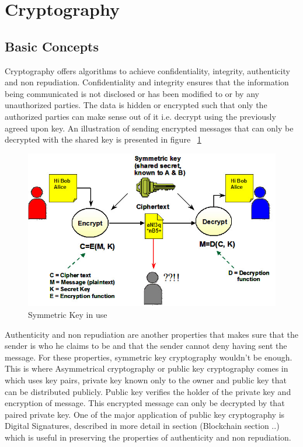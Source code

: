 \section{Cryptography}
\subsection{Basic Concepts}
Cryptography offers algorithms to achieve confidentiality, integrity, authenticity 
and non repudiation. Confidentiality and integrity ensures that the information 
being communicated is not disclosed or has been modified to or by any unauthorized 
parties. The data is hidden or encrypted such that only the authorized parties can 
make sense out of it i.e. decrypt using the previously agreed upon key. 
An illustration of 
sending encrypted messages that can only be decrypted with the shared key is presented 
in figure ~\ref{fig:basic terminology}
\begin{figure}[h]
\centering
\includegraphics[width = 1.0\textwidth]{symmetric-alice-bob.jpg}
\caption{Symmetric Key in use \cite{symmetrickey} }
\label{fig:basic terminology}
\end{figure}
Authenticity and non repudiation are another properties that makes sure that 
the sender is who he claims to be and that the sender cannot deny having sent 
the message. For these properties, symmetric key cryptography wouldn't be 
enough. This is where Asymmetrical cryptography or public key cryptography comes 
in which uses key pairs, private key known only to the owner and public key that 
can be distributed publicly. Public key verifies the holder of the private key 
and encryption of message. This encrypted message can only be decrypted by that 
paired private key. One of the major application of public key cryptography is 
Digital Signatures, described in more detail in section (Blockchain section ..) 
which is useful in preserving the properties of authenticity and non 
repudiation. 


